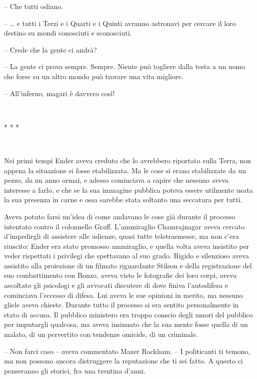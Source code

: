 {-- Che tutti odiano.}

{-- \ldots{} e tutti i Terzi e i Quarti e i Quinti avranno astronavi per
	cercare il loro destino su mondi conosciuti e sconosciuti.}

{-- Crede che la gente ci andrà?}

{-- La gente ci prova sempre. Sempre. Niente può togliere dalla testa a
	un uomo che forse su un altro mondo può trovare una vita migliore.}

{-- All'inferno, magari è davvero così!}

{~}

\begin{center}
	{* * *}
\end{center}

{~}

{Nei primi tempi Ender aveva creduto che lo avrebbero riportato sulla
	Terra, non appena la situazione si fosse stabilizzata. Ma le cose si
	erano stabilizzate da un pezzo, da un anno ormai, e adesso cominciava a
	capire che nessuno aveva interesse a farlo, e che se la sua immagine
	pubblica poteva essere utilmente usata la sua presenza in carne e ossa
	sarebbe stata soltanto una seccatura per tutti.}

{Aveva potuto farsi un'idea di come andavano le cose già durante il
	processo intentato contro il colonnello Graff. L'ammiraglio Chamrajnagar
	aveva cercato d'impedirgli di assistere alle udienze, quasi tutte
	teletrasmesse, ma non c'era riuscito: Ender era stato promosso
	ammiraglio, e quella volta aveva insistito per veder rispettati i
	privilegi che spettavano al suo grado. Rigido e silenzioso aveva
	assistito alla proiezione di un filmato riguardante Stilson e della
	registrazione del suo combattimento con Bonzo, aveva visto le fotografie
	dei loro corpi, aveva ascoltato gli psicologi e gli avvocati discutere
	di dove finiva l'autodifesa e cominciava l'eccesso di difesa. Lui aveva
	le sue opinioni in merito, ma nessuno gliele aveva chieste. Durante
	tutto il processo si era sentito personalmente in stato di accusa. Il
	pubblico ministero era troppo conscio degli umori del pubblico per
	imputargli qualcosa, ma aveva insinuato che la sua mente fosse quella di
	un malato, di un pervertito con tendenze omicide, di un criminale.}

{-- Non farci caso -- aveva commentato Mazer Rackham. -- I politicanti
	ti temono, ma non possono ancora distruggere la reputazione che ti sei
	fatto. A questo ci penseranno gli storici, fra una trentina d'anni.}


